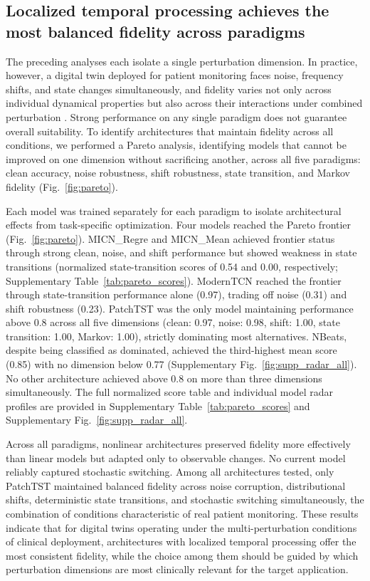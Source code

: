 \subsection*{Localized temporal processing achieves the most balanced fidelity across paradigms}

The preceding analyses each isolate a single perturbation dimension. In practice, however, a digital twin deployed for patient monitoring faces noise, frequency shifts, and state changes simultaneously, and fidelity varies not only across individual dynamical properties but also across their interactions under combined perturbation \cite{clifford2006advanced, sornmo2005bioelectrical}. Strong performance on any single paradigm does not guarantee overall suitability. To identify architectures that maintain fidelity across all conditions, we performed a Pareto analysis, identifying models that cannot be improved on one dimension without sacrificing another, across all five paradigms: clean accuracy, noise robustness, shift robustness, state transition, and Markov fidelity (Fig.~\ref{fig:pareto}).

Each model was trained separately for each paradigm to isolate architectural effects from task-specific optimization. Four models reached the Pareto frontier (Fig.~\ref{fig:pareto}). MICN\_Regre and MICN\_Mean achieved frontier status through strong clean, noise, and shift performance but showed weakness in state transitions (normalized state-transition scores of 0.54 and 0.00, respectively; Supplementary Table~\ref{tab:pareto_scores}). ModernTCN reached the frontier through state-transition performance alone (0.97), trading off noise (0.31) and shift robustness (0.23). PatchTST was the only model maintaining performance above $0.8$ across all five dimensions (clean: 0.97, noise: 0.98, shift: 1.00, state transition: 1.00, Markov: 1.00), strictly dominating most alternatives. NBeats, despite being classified as dominated, achieved the third-highest mean score (0.85) with no dimension below 0.77 (Supplementary Fig.~\ref{fig:supp_radar_all}). No other architecture achieved above $0.8$ on more than three dimensions simultaneously. The full normalized score table and individual model radar profiles are provided in Supplementary Table~\ref{tab:pareto_scores} and Supplementary Fig.~\ref{fig:supp_radar_all}.

Across all paradigms, nonlinear architectures preserved fidelity more effectively than linear models but adapted only to observable changes. No current model reliably captured stochastic switching. Among all architectures tested, only PatchTST maintained balanced fidelity across noise corruption, distributional shifts, deterministic state transitions, and stochastic switching simultaneously, the combination of conditions characteristic of real patient monitoring. These results indicate that for digital twins operating under the multi-perturbation conditions of clinical deployment, architectures with localized temporal processing offer the most consistent fidelity, while the choice among them should be guided by which perturbation dimensions are most clinically relevant for the target application.

